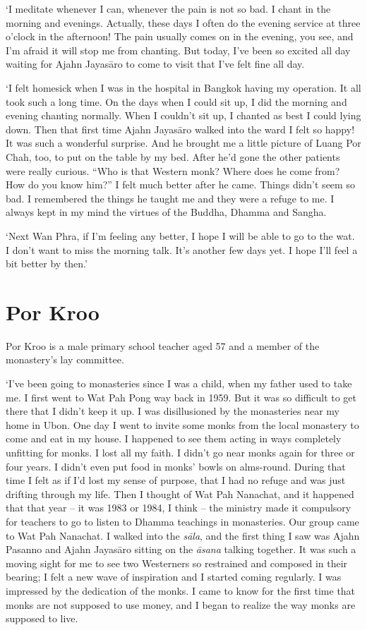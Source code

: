 `I meditate whenever I can, whenever the pain is not so bad. I chant in
the morning and evenings. Actually, these days I often do the evening
service at three o'clock in the afternoon! The pain usually comes on in
the evening, you see, and I'm afraid it will stop me from chanting. But
today, I've been so excited all day waiting for Ajahn Jayasāro to come
to visit that I've felt fine all day. 

`I felt homesick when I was in the hospital in Bangkok having my
operation. It all took such a long time. On the days when I could sit
up, I did the morning and evening chanting normally. When I couldn't sit
up, I chanted as best I could lying down. Then that first time Ajahn
Jayasāro walked into the ward I felt so happy! It was such a wonderful
surprise. And he brought me a little picture of Luang Por Chah, too, to
put on the table by my bed. After he'd gone the other patients were
really curious. ``Who is that Western monk? Where does he come from? How
do you know him?'' I felt much better after he came. Things didn't seem
so bad. I remembered the things he taught me and they were a refuge to
me. I always kept in my mind the virtues of the Buddha, Dhamma and
Sangha. 

`Next Wan Phra, if I'm feeling any better, I hope I will be able to go
to the wat. I don't want to miss the morning talk. It's another few days
yet. I hope I'll feel a bit better by then.'

\section{Por Kroo}

Por Kroo is a male primary school teacher aged 57 and a member of the
monastery's lay committee. 

`I've been going to monasteries since I was a child, when my father used
to take me. I first went to Wat Pah Pong way back in 1959. But it was so
difficult to get there that I didn't keep it up. I was disillusioned by
the monasteries near my home in Ubon. One day I went to invite some
monks from the local monastery to come and eat in my house. I happened
to see them acting in ways completely unfitting for monks. I lost all my
faith. I didn't go near monks again for three or four years. I didn't
even put food in monks' bowls on alms-round. During that time I felt as
if I'd lost my sense of purpose, that I had no refuge and was just
drifting through my life. Then I thought of Wat Pah Nanachat, and it
happened that that year -- it was 1983 or 1984, I think -- the
ministry made it compulsory for teachers to go to listen to Dhamma
teachings in monasteries. Our group came to Wat Pah Nanachat. I walked
into the \emph{sāla}, and the first thing I saw was Ajahn Pasanno and
Ajahn Jayasāro sitting on the \emph{āsana} talking together. It was such
a moving sight for me to see two Westerners so restrained and composed
in their bearing; I felt a new wave of inspiration and I started coming
regularly. I was impressed by the dedication of the monks. I came to
know for the first time that monks are not supposed to use money, and I
began to realize the way monks are supposed to live. 


